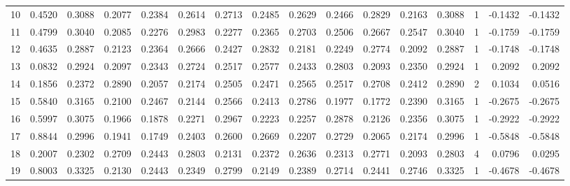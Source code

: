 \begin{tabular}{lrrrrrrrrrrrrrrr}
10 &      0.4520 &  0.3088 &  0.2077 &  0.2384 &  0.2614 &  0.2713 &  0.2485 &  0.2629 &  0.2466 &  0.2829 &   0.2163 &     0.3088 &      1 &                   -0.1432 &                    -0.1432 \\
11 &      0.4799 &  0.3040 &  0.2085 &  0.2276 &  0.2983 &  0.2277 &  0.2365 &  0.2703 &  0.2506 &  0.2667 &   0.2547 &     0.3040 &      1 &                   -0.1759 &                    -0.1759 \\
12 &      0.4635 &  0.2887 &  0.2123 &  0.2364 &  0.2666 &  0.2427 &  0.2832 &  0.2181 &  0.2249 &  0.2774 &   0.2092 &     0.2887 &      1 &                   -0.1748 &                    -0.1748 \\
13 &      0.0832 &  0.2924 &  0.2097 &  0.2343 &  0.2724 &  0.2517 &  0.2577 &  0.2433 &  0.2803 &  0.2093 &   0.2350 &     0.2924 &      1 &                    0.2092 &                     0.2092 \\
14 &      0.1856 &  0.2372 &  0.2890 &  0.2057 &  0.2174 &  0.2505 &  0.2471 &  0.2565 &  0.2517 &  0.2708 &   0.2412 &     0.2890 &      2 &                    0.1034 &                     0.0516 \\
15 &      0.5840 &  0.3165 &  0.2100 &  0.2467 &  0.2144 &  0.2566 &  0.2413 &  0.2786 &  0.1977 &  0.1772 &   0.2390 &     0.3165 &      1 &                   -0.2675 &                    -0.2675 \\
16 &      0.5997 &  0.3075 &  0.1966 &  0.1878 &  0.2271 &  0.2967 &  0.2223 &  0.2257 &  0.2878 &  0.2126 &   0.2356 &     0.3075 &      1 &                   -0.2922 &                    -0.2922 \\
17 &      0.8844 &  0.2996 &  0.1941 &  0.1749 &  0.2403 &  0.2600 &  0.2669 &  0.2207 &  0.2729 &  0.2065 &   0.2174 &     0.2996 &      1 &                   -0.5848 &                    -0.5848 \\
18 &      0.2007 &  0.2302 &  0.2709 &  0.2443 &  0.2803 &  0.2131 &  0.2372 &  0.2636 &  0.2313 &  0.2771 &   0.2093 &     0.2803 &      4 &                    0.0796 &                     0.0295 \\
19 &      0.8003 &  0.3325 &  0.2130 &  0.2443 &  0.2349 &  0.2799 &  0.2149 &  0.2389 &  0.2714 &  0.2441 &   0.2746 &     0.3325 &      1 &                   -0.4678 &                    -0.4678 \\
\bottomrule
\end{tabular}
